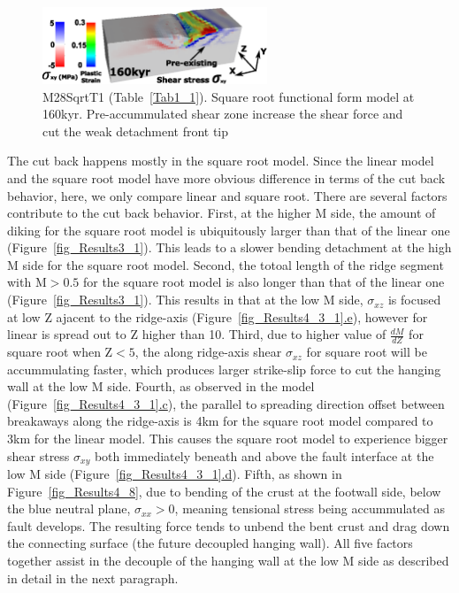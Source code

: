 \begin{figure}[h]
  \centering
    \includegraphics[width=0.6\textwidth]{./Figures/fig_Results4_5_sqrt_cut_back_pre_accummulated_shear_zone.eps}
  \caption{M28SqrtT1 (Table~\hyperref[Tab1_1]{\ref{Tab1_1}}). Square root functional form model at 160kyr. Pre-accummulated shear zone increase the shear force and cut the weak detachment front tip}
 \label{fig_Results4_5}
\end{figure}   

The cut back happens mostly in the square root model. Since the linear model and the square root model have more obvious difference in terms of the cut back behavior, here, we only compare linear and square root. There are several factors contribute to the cut back behavior. First, at the higher M side, the amount of diking for the square root model is ubiquitously larger than that of the linear one (Figure~\hyperref[fig_Results3_1]{\ref{fig_Results3_1}}). This leads to a slower bending detachment at the high M side for the square root model. Second, the totoal length of the ridge segment with M$>0.5$ for the square root model is also longer than that of the linear one (Figure~\hyperref[fig_Results3_1]{\ref{fig_Results3_1}}). This results in that at the low M side, $\sigma_{xz}$ is focused at low Z ajacent to the ridge-axis (Figure~\hyperref[fig_Results4_3_1]{\ref{fig_Results4_3_1}.e}), however for linear is spread out to Z higher than 10. Third, due to higher value of $\frac{dM}{dZ}$ for square root when Z$<5$, the along ridge-axis shear $\sigma_{xz}$ for square root will be accummulating faster, which produces larger strike-slip force to cut the hanging wall at the low M side. Fourth, as observed in the model (Figure~\hyperref[fig_Results4_3_1]{\ref{fig_Results4_3_1}.c}), the parallel to spreading direction offset between breakaways along the ridge-axis is 4km for the square root model compared to 3km for the linear model. This causes the square root model to experience bigger shear stress $\sigma_{xy}$ both immediately beneath and above the fault interface at the low M side (Figure~\hyperref[fig_Results4_3_1]{\ref{fig_Results4_3_1}.d}). Fifth, as shown in Figure~\hyperref[fig_Results4_8]{\ref{fig_Results4_8}}, due to bending of the crust at the footwall side, below the blue neutral plane, $\sigma_{xx}>0$, meaning tensional stress being accummulated as fault develops. The resulting force tends to unbend the bent crust and drag down the connecting surface (the future decoupled hanging wall). All five factors together assist in the decouple of the hanging wall at the low M side as described in detail in the next paragraph.

